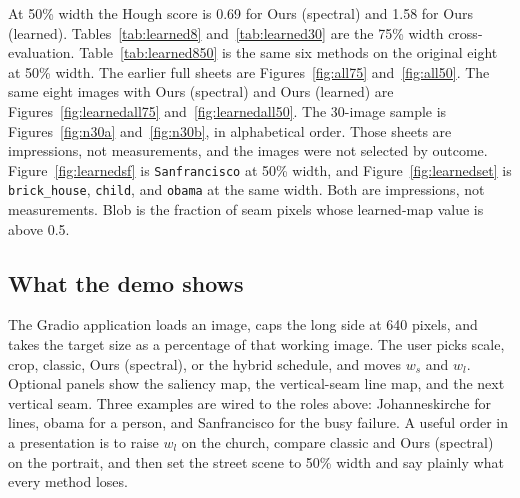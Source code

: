 \documentclass[10pt,twocolumn,letterpaper]{article}
\begin{document}
At 50\% width the Hough score is 0.69 for Ours (spectral) and 1.58 for Ours (learned).
Tables~\ref{tab:learned8} and~\ref{tab:learned30} are the 75\% width cross-evaluation.
Table~\ref{tab:learned850} is the same six methods on the original eight at 50\% width.
The earlier full sheets are Figures~\ref{fig:all75} and~\ref{fig:all50}.
The same eight images with Ours (spectral) and Ours (learned) are Figures~\ref{fig:learnedall75} and~\ref{fig:learnedall50}.
The 30-image sample is Figures~\ref{fig:n30a} and~\ref{fig:n30b}, in alphabetical order.
Those sheets are impressions, not measurements, and the images were not selected by outcome.
Figure~\ref{fig:learnedsf} is \texttt{Sanfrancisco} at 50\% width, and Figure~\ref{fig:learnedset} is \texttt{brick\_house}, \texttt{child}, and \texttt{obama} at the same width.
Both are impressions, not measurements.
Blob is the fraction of seam pixels whose learned-map value is above 0.5.

\subsection{What the demo shows}
The Gradio application loads an image, caps the long side at 640 pixels, and takes the target size as a percentage of that working image.
The user picks scale, crop, classic, Ours (spectral), or the hybrid schedule, and moves $w_s$ and $w_l$.
Optional panels show the saliency map, the vertical-seam line map, and the next vertical seam.
Three examples are wired to the roles above: Johanneskirche for lines, obama for a person, and Sanfrancisco for the busy failure.
A useful order in a presentation is to raise $w_l$ on the church, compare classic and Ours (spectral) on the portrait, and then set the street scene to 50\% width and say plainly what every method loses.
\end{document}
